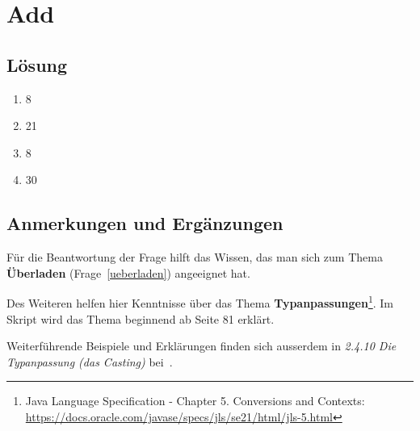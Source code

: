 \chapter{Add}

\section*{Lösung}

\begin{enumerate}
    \item 8
    \item 21
    \item 8
    \item 30
\end{enumerate}


\section*{Anmerkungen und Ergänzungen}

Für die Beantwortung der Frage hilft das Wissen, das man sich zum Thema \textbf{Überladen} (Frage~\ref{ueberladen}) angeeignet hat.

Des Weiteren helfen hier Kenntnisse über das Thema \textbf{Typanpassungen}\footnote{
    Java Language Specification - Chapter 5. Conversions and Contexts: \url{https://docs.oracle.com/javase/specs/jls/se21/html/jls-5.html}
}.
Im Skript wird das Thema beginnend ab Seite 81 erklärt.

Weiterführende Beispiele und Erklärungen finden sich ausserdem in \textit{2.4.10 Die Typanpassung (das Casting)} bei~\cite[170 ff.]{Ull12}.